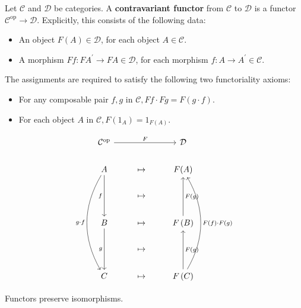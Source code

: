 \documentclass[12pt, oneside]{book}
\begin{document}
\begin{definition}
    Let $\mathcal{C}$ and $\mathcal{D}$ be categories. A \textbf{contravariant functor} from $\mathcal{C}$ to $\mathcal{D}$ is a functor $\mathcal{C}^{\mathrm{op}} \rightarrow \mathcal{D}$.
    Explicitly, this consists of the following data:
    \begin{itemize}
        \item
              An object $F \left(A\right)\in \mathcal{D}$, for each object $A \in \mathcal{C}$.

        \item
              A morphism $F f: F A^{\prime} \rightarrow F A \in \mathcal{D}$, for each morphism $f: A \rightarrow A^{\prime} \in \mathcal{C}$.
    \end{itemize}
    The assignments are required to satisfy the following two functoriality axioms:
    \begin{itemize}
        \item
              For any composable pair $f, g$ in $\mathcal{C}, F f \cdot F g=F(g \cdot f)$.

        \item
              For each object $A$ in $\mathcal{C}, F\left(1_A\right)=1_{F(A)}$.
    \end{itemize}
    \begin{equation*}
        \begin{tikzcd}
            \mathcal{C}^{\op} \arrow[rr, "F"]  & &\mathcal{D} \\
            A \arrow[dd, "f"'] \arrow[dddd,"g \cdot f"',bend right]   & \mapsto & F(A)  \\
            & \mapsto & \\
            B \arrow[dd, "g"']           &  \mapsto & F\left(B\right)\arrow[uu, "F(g)"']\\
            & \mapsto & \\
            C         &  \mapsto & F\left(C\right)\arrow[uu, "F(g)"'] \arrow[uuuu, "F(f)\cdot F(g)"',bend right]
        \end{tikzcd}
    \end{equation*}
\end{definition}


\begin{lemma}
    Functors preserve isomorphisms.
\end{lemma}
\end{document}
